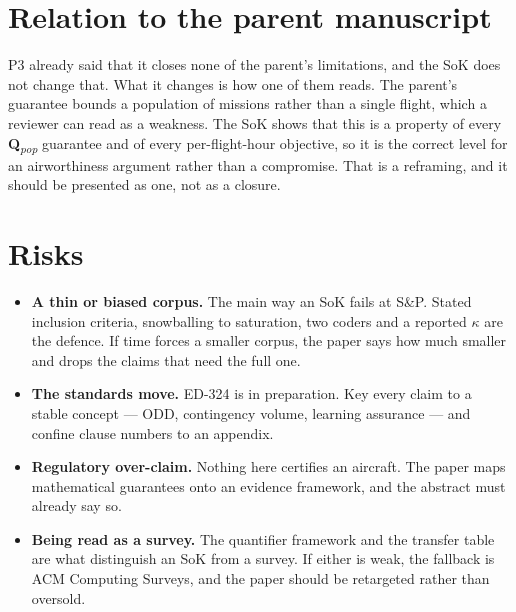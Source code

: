 \documentclass[11pt,a4paper]{article}
\newcommand{\Qlvl}[1]{\textbf{Q}\textsubscript{\textit{#1}}}
\newcommand{\Qpop}{\Qlvl{pop}}
\begin{document}
\section{Relation to the parent manuscript}
P3 already said that it closes none of the parent's limitations, and the SoK
does not change that. What it changes is how one of them reads. The parent's
guarantee bounds a population of missions rather than a single flight, which a
reviewer can read as a weakness. The SoK shows that this is a property of every
\Qpop{} guarantee and of every per-flight-hour objective, so it is the correct
level for an airworthiness argument rather than a compromise. That is a
reframing, and it should be presented as one, not as a closure.

\section{Risks}
\begin{itemize}
\item \textbf{A thin or biased corpus.} The main way an SoK fails at S\&P. Stated
  inclusion criteria, snowballing to saturation, two coders and a reported
  $\kappa$ are the defence. If time forces a smaller corpus, the paper says
  how much smaller and drops the claims that need the full one.
\item \textbf{The standards move.} ED-324 is in preparation. Key every claim to a
  stable concept --- ODD, contingency volume, learning assurance --- and confine
  clause numbers to an appendix.
\item \textbf{Regulatory over-claim.} Nothing here certifies an aircraft. The
  paper maps mathematical guarantees onto an evidence framework, and the
  abstract must already say so.
\item \textbf{Being read as a survey.} The quantifier framework and the transfer
  table are what distinguish an SoK from a survey. If either is weak, the
  fallback is ACM Computing Surveys, and the paper should be retargeted rather
  than oversold.
\end{itemize}

\end{document}
